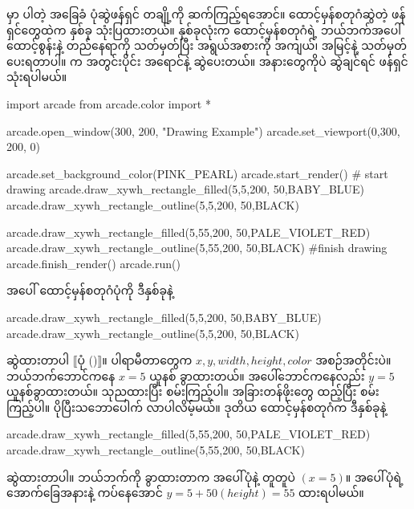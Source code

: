  မှာ ပါတဲ့ အခြေခံ ပုံဆွဲဖန်ရှင် တချို့ကို ဆက်ကြည့်ရအောင်။ ထောင့်မှန်စတုဂံဆွဲတဲ့ ဖန်ရှင်တွေထဲက နှစ်ခု သုံးပြထားတယ်။ နှစ်ခုလုံးက  ထောင့်မှန်စတုဂံရဲ့ ဘယ်ဘက်အပေါ်ထောင့်စွန်းနဲ့ တည်နေရာကို သတ်မှတ်ပြီး အရွယ်အစားကို အကျယ်၊ အမြင့်နဲ့ သတ်မှတ်ပေးရတာပါ။   က အတွင်းပိုင်း အရောင်နဲ့ ဆွဲပေးတယ်။ အနားတွေကိုပဲ ဆွဲချင်ရင်  ဖန်ရှင်သုံးရပါမယ်။
%
\begin{py}
import arcade
from arcade.color import *

arcade.open_window(300, 200, "Drawing Example")
arcade.set_viewport(0,300, 200, 0)

arcade.set_background_color(PINK_PEARL)
arcade.start_render()
# start drawing
arcade.draw_xywh_rectangle_filled(5,5,200, 50,BABY_BLUE)
arcade.draw_xywh_rectangle_outline(5,5,200, 50,BLACK)

arcade.draw_xywh_rectangle_filled(5,55,200, 50,PALE_VIOLET_RED)
arcade.draw_xywh_rectangle_outline(5,55,200, 50,BLACK)
#finish drawing
arcade.finish_render()
arcade.run()
\end{py}
%
အပေါ် ထောင့်မှန်စတုဂံပုံကို ဒီနှစ်ခုနဲ့ 
%
\begin{py}
arcade.draw_xywh_rectangle_filled(5,5,200, 50,BABY_BLUE)
arcade.draw_xywh_rectangle_outline(5,5,200, 50,BLACK)
\end{py}
%
ဆွဲထားတာပါ $\big\llbracket$ပုံ (\fRefNo{\ref{fig:ch07rects}})$\big\rrbracket$။ ပါရာမီတာတွေက $x, y, width, height, color$ အစဉ်အတိုင်းပဲ။ ဘယ်ဘက်ဘောင်ကနေ $x = 5$ ယူနစ် ခွာထားတယ်။  အပေါ်ဘောင်ကနေလည်း $y = 5$ ယူနစ်ခွာထားတယ်။ သုညထားပြီး စမ်းကြည့်ပါ။ အခြားတန်ဖိုးတွေ ထည့်ပြီး စမ်းကြည့်ပါ။ ပိုပြီးသဘောပေါက် လာပါလိမ့်မယ်။ ဒုတိယ ထောင့်မှန်စတုဂံက ဒီနှစ်ခုနဲ့
%
\begin{py}
arcade.draw_xywh_rectangle_filled(5,55,200, 50,PALE_VIOLET_RED)
arcade.draw_xywh_rectangle_outline(5,55,200, 50,BLACK)
\end{py}
%
ဆွဲထားတာပါ။ ဘယ်ဘက်ကို ခွာထားတာက အပေါ်ပုံနဲ့ တူတူပဲ $(x = 5)$။ အပေါ်ပုံရဲ့ အောက်ခြေအနားနဲ့ ကပ်နေအောင် $y = 5 + 50 (height) = 55$ ထားရပါမယ်။
\begin{figure}[tb!]
\caption{}
\label{fig:ch07rects}
\end{figure}

